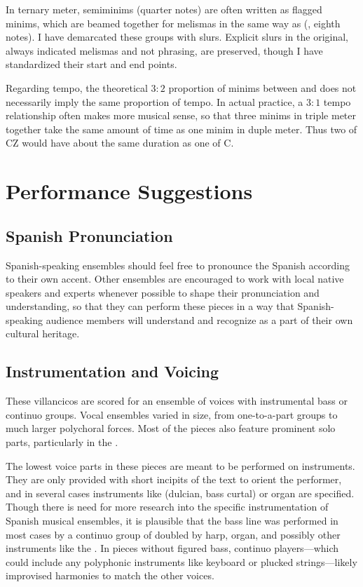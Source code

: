 In ternary meter, semiminims (quarter notes) are often written as flagged
minims, which are beamed together for melismas in the same way as
 (, eighth notes).
I have demarcated these groups with slurs.
Explicit slurs in the original, always indicated melismas and not phrasing,
are preserved, though I have standardized their start and end points.

Regarding tempo, the theoretical $3:2$ proportion of minims between
\meterCThreeTwo{} and \meterC{} does not necessarily imply the same proportion of
tempo.  
In actual practice, a $3:1$ tempo relationship often makes more musical sense,
so that three minims in triple meter together take the same amount of time as
one minim in duple meter.
Thus two  of CZ would have about the same duration as one 
 of C.

\section{Performance Suggestions}

\subsection{Spanish Pronunciation}
Spanish-speaking ensembles should feel free to pronounce the Spanish according
to their own accent.
Other ensembles are encouraged to work with local native speakers and experts
whenever possible to shape their pronunciation and understanding, so that they
can perform these pieces in a way that Spanish-speaking audience members will
understand and recognize as a part of their own cultural heritage.

\subsection{Instrumentation and Voicing}
These villancicos are scored for an ensemble of voices with instrumental bass 
or continuo groups.
Vocal ensembles varied in size, from one-to-a-part groups to much larger 
polychoral forces.
Most of the pieces also feature prominent solo parts, particularly in the 
.

The lowest voice parts in these pieces are meant to be performed on instruments. 
They are only provided with short incipits of the text to orient the 
performer, and in several cases instruments like  (dulcian, bass
curtal) or organ are specified.
Though there is need for more research into the specific instrumentation of 
Spanish musical ensembles, it is plausible that the bass line was performed in 
most cases by a continuo group of  doubled by harp, organ, and 
possibly other instruments like the .%
    \Autocite
    [On the changing instrumentation in one Spanish institution, see][]
    {Torrente:PhD}
In pieces without figured bass, continuo players---which could include any
polyphonic instruments like keyboard or plucked strings---likely improvised
harmonies to match the other voices.

